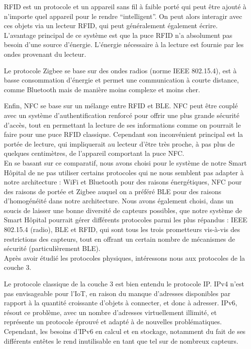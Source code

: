 \documentclass{article}
\begin{document}
RFID est un protocole et un appareil sans fil à faible porté qui peut être ajouté à n’importe quel appareil pour le rendre “intelligent”. On peut alors interagir avec ces objets via un lecteur RFID, qui peut généralement également écrire. L’avantage principal de ce système est que la puce RFID n’a absolument pas besoin d’une source d’énergie. L’énergie nécessaire à la lecture est fournie par les ondes provenant du lecteur.

Le protocole Zigbee se base sur des ondes radios (norme IEEE 802.15.4), est à basse consommation d’énergie et permet une communication à courte distance, comme Bluetooth mais de manière moins complexe et moins cher.

Enfin, NFC se base sur un mélange entre RFID et BLE. NFC peut être couplé avec un système d’authentification renforcé pour offrir une plus grande sécurité d’accès, tout en permettant la lecture de ses informations comme on pourrait le faire pour une puce RFID classique. Cependant son inconvénient principal est la portée de lecture, qui impliquerait au lecteur d'être très proche, à pas plus de quelques centimètres, de l’appareil comportant la puce NFC.
\\

En se basant sur ce comparatif, nous avons choisi pour le système de notre Smart Hôpital de ne pas utiliser certains protocoles qui ne nous semblent pas adapter à notre architecture : WiFi et Bluetooth pour des raisons énergétiques, NFC pour des raisons de portée et Zigbee auquel on a préféré BLE pour des raisons d'homogénéité dans notre architecture. Nous avons également choisi, dans un soucis de laisser une bonne diversité de capteurs possibles, que notre système de Smart Hôpital pourrait gérer différents protocoles parmi les plus répandus : IEEE 802.15.4 (radio), BLE et RFID, qui sont tous les trois prometteurs vis-à-vis des restrictions des capteurs, tout en offrant un certain nombre de mécanismes de sécurité (particulièrement BLE).
\\

Après avoir étudié les protocoles physiques, intéressons nous aux protocoles de la couche 3.

Le protocole classique de la couche 3 est bien entendu le protocole IP. IPv4 n’est pas envisageable pour l’IoT, en raison du manque d’adresses disponibles par rapport à la quantité croissante d’objets à connecter, et donc à adresser. IPv6, résout ce problème, avec un nombre d’adresses virtuellement illimité, et représente un protocole éprouvé et adapté à de nouvelles problématiques. Cependant, les besoins d’IPv6 en calcul et en stockage, notamment du fait de ses différents entêtes le rend inutilisable en tant que tel sur de nombreux capteurs.
\end{document}
